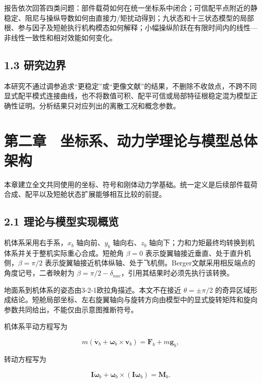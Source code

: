 \documentclass[UTF8,11pt,oneside,openany,fontset=windows]{ctexbook}
\begin{document}
报告依次回答四类问题：部件载荷如何在统一坐标系中闭合；可信配平点附近的静稳定、阻尼与操纵导数如何由直接力/矩扰动得到；九状态和十三状态模型的局部根、参与因子及短舱执行机构模态如何解释；小幅操纵阶跃在有限时间内的线性---非线性一致性和相对效能如何变化。

\section{1.3 研究边界}\label{ux7814ux7a76ux8fb9ux754c}

本研究不通过调参追求``更稳定''或``更像文献''的结果，不删除不收敛点，不跨不同显式配平模式连接曲线，也不将数值可积、配平可信或局部特征根稳定混为模型正确性证明。分析结果只对应列出的离散工况和概念参数。

\chapter{第二章　坐标系、动力学理论与模型总体架构}\label{ux7b2cux4e8cux7ae0-ux5750ux6807ux7cfbux52a8ux529bux5b66ux7406ux8bbaux4e0eux6a21ux578bux603bux4f53ux67b6ux6784}

本章建立全文共同使用的坐标、符号和刚体动力学基础。统一定义是后续部件载荷合成、配平以及短舱状态扩展能够相互比较的前提。

\section{2.1
理论与模型实现概览}\label{ux7406ux8bbaux4e0eux6a21ux578bux5b9eux73b0ux6982ux89c8}

机体系采用右手系，\(x_b\) 轴向前、\(y_b\) 轴向右、\(z_b\)
轴向下；力和力矩最终均转换到机体系并关于整机实际重心合成。短舱角
\(\beta=0\) 表示旋翼轴接近垂直、处于直升机侧，\(\beta=\pi/2\)
表示旋翼轴接近机体纵轴、处于飞机侧。Berger文献采用相反端点的角度记号，二者映射为
\(\beta=\pi/2-\delta_{nac}\)，引用其结果时必须先执行该转换。

地面系到机体系的姿态由3-2-1欧拉角描述。本文不在接近 \(\theta=\pm\pi/2\)
的奇异区域形成结论。短舱局部坐标、左右旋翼轴向与旋转方向由模型中的显式旋转矩阵和旋向参数共同给出，不能仅由示意图推断符号。

机体系平动方程写为

\[m(\dot{\mathbf{v}}_b+\boldsymbol{\omega}_b\times\mathbf{v}_b)
=\mathbf{F}_b+m\mathbf{g}_b,\]

转动方程写为

\[\mathbf{I}\dot{\boldsymbol{\omega}}_b
+\boldsymbol{\omega}_b\times(\mathbf{I}\boldsymbol{\omega}_b)
=\mathbf{M}_b.\]
\end{document}
